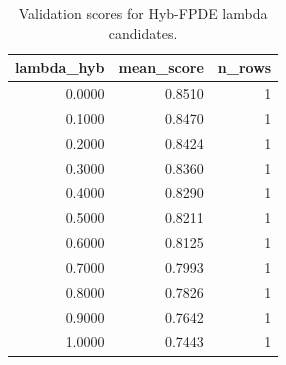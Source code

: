 \begin{table}[t]
\caption{Validation scores for Hyb-FPDE lambda candidates.}
\label{tab:lambda_distribution_computed}
\centering
\begin{tabular}{rrr}
\toprule
lambda\_hyb & mean\_score & n\_rows \\
\midrule
0.0000 & 0.8510 & 1 \\
0.1000 & 0.8470 & 1 \\
0.2000 & 0.8424 & 1 \\
0.3000 & 0.8360 & 1 \\
0.4000 & 0.8290 & 1 \\
0.5000 & 0.8211 & 1 \\
0.6000 & 0.8125 & 1 \\
0.7000 & 0.7993 & 1 \\
0.8000 & 0.7826 & 1 \\
0.9000 & 0.7642 & 1 \\
1.0000 & 0.7443 & 1 \\
\bottomrule
\end{tabular}

\end{table}
